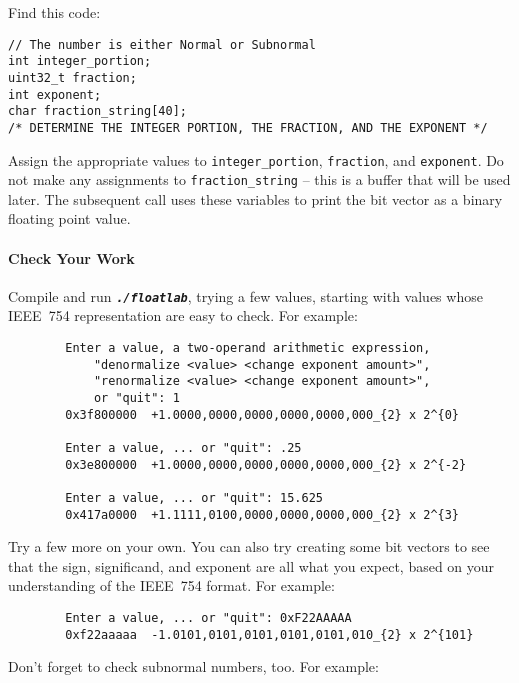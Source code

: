     Find this code:

    \begin{lstlisting}
// The number is either Normal or Subnormal
int integer_portion;
uint32_t fraction;
int exponent;
char fraction_string[40];
/* DETERMINE THE INTEGER PORTION, THE FRACTION, AND THE EXPONENT */
    \end{lstlisting}

    Assign the appropriate values to \lstinline{integer_portion}, \lstinline{fraction}, and \lstinline{exponent}.
    Do not make any assignments to \lstinline{fraction_string} -- this is a buffer that will be used later.
    The subsequent  call uses these variables to print the bit vector as a binary floating point value.

    \paragraph*{Check Your Work}

    Compile and run \texttt{\textbf{\textit{./floatlab}}}, trying a few values, starting with values whose IEEE~754 representation are easy to check.
    For example:

    \begin{verbatim}
        Enter a value, a two-operand arithmetic expression,
            "denormalize <value> <change exponent amount>",
            "renormalize <value> <change exponent amount>",
            or "quit": 1
        0x3f800000	+1.0000,0000,0000,0000,0000,000_{2} x 2^{0}

        Enter a value, ... or "quit": .25
        0x3e800000	+1.0000,0000,0000,0000,0000,000_{2} x 2^{-2}

        Enter a value, ... or "quit": 15.625
        0x417a0000	+1.1111,0100,0000,0000,0000,000_{2} x 2^{3}
    \end{verbatim}

    Try a few more on your own.
    You can also try creating some bit vectors to see that the sign, significand, and exponent are all what you expect, based on your understanding of the IEEE~754 format.
    For example:

    \begin{verbatim}
        Enter a value, ... or "quit": 0xF22AAAAA
        0xf22aaaaa	-1.0101,0101,0101,0101,0101,010_{2} x 2^{101}
    \end{verbatim}

    Don't forget to check subnormal numbers, too.
    For example:

